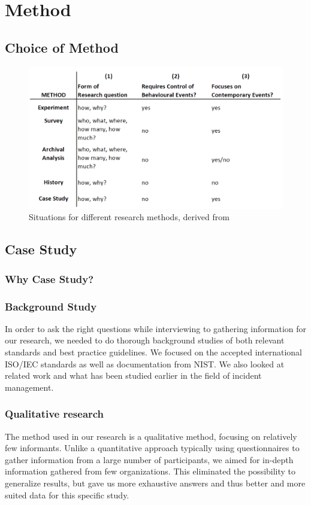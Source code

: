 \chapter{Method}
\section{Choice of Method}
\begin{figure}[h]
\begin{center}
\includegraphics[scale=0.35]{methods.png}
\caption[Situations for different research methods]{Situations for different research methods, derived from \cite{CaseStudyResearch}}
\label{fig:methods}
\end{center}
\end{figure}
\section{Case Study}
\subsection{Why Case Study?}
\subsection{Background Study}
In order to ask the right questions while interviewing to gathering information for our research, we needed to do thorough background studies of both relevant standards and best practice guidelines. We focused on the accepted international ISO/IEC standards as well as documentation from \ac{NIST}.
We also looked at related work and what has been studied earlier in the field of incident management. 
\subsection{Qualitative research}
The method used in our research is a qualitative method, focusing on relatively few informants. Unlike a quantitative approach typically using questionnaires to gather information from a large number of participants, we aimed for in-depth information gathered from few organizations. This eliminated the possibility to generalize results, but gave us more exhaustive answers and thus better and more suited data for this specific study.

